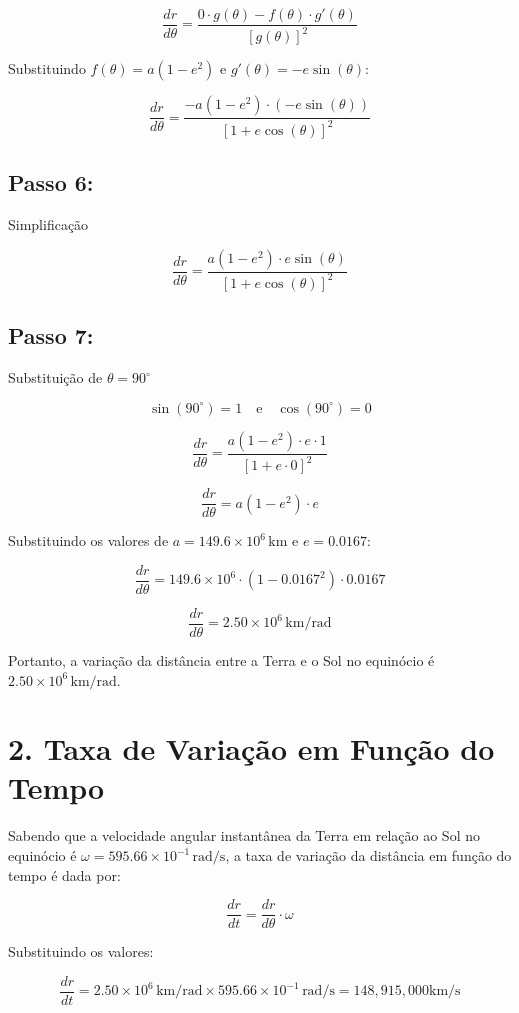 \documentclass[portuguese,12pt,a4paper,onecolumn]{article}
\begin{document}
	\[
	\frac{dr}{d\theta} = \frac{0 \cdot g(\theta) - f(\theta) \cdot g'(\theta)}{[g(\theta)]^2}
	\]
	
	Substituindo \( f(\theta) = a(1 - e^2) \) e \( g'(\theta) = -e \sin(\theta) \):
	
	\[
	\frac{dr}{d\theta} = \frac{-a(1 - e^2) \cdot (-e \sin(\theta))}{[1 + e \cos(\theta)]^2}
	\]
	
	\subsection{Passo 6:} Simplificação
	
	\[
	\frac{dr}{d\theta} = \frac{a(1 - e^2) \cdot e \sin(\theta)}{[1 + e \cos(\theta)]^2}
	\]
	
	
	\subsection{Passo 7:} Substituição de \( \theta = 90^\circ \)
	
	\[
	\sin(90^\circ) = 1 \quad \text{e} \quad \cos(90^\circ) = 0
	\]
	
	
	\[
	\frac{dr}{d\theta} = \frac{a(1 - e^2) \cdot e \cdot 1}{[1 + e \cdot 0]^2}
	\]
	
	
	\[
	\frac{dr}{d\theta} = a(1 - e^2) \cdot e
	\]
	
	Substituindo os valores de \( a = 149.6 \times 10^6 \, \text{km} \) e \( e = 0.0167 \):
	
	\[
	\frac{dr}{d\theta} = 149.6 \times 10^6 \cdot (1 - 0.0167^2) \cdot 0.0167
	\]
	
	\[
	\frac{dr}{d\theta} = 2.50 \times 10^6 \, \text{km/rad}
	\]
	
	Portanto, a variação da distância entre a Terra e o Sol no equinócio é \( 2.50 \times 10^6 \, \text{km/rad} \).
	
	\section*{2. Taxa de Variação em Função do Tempo}
	
	Sabendo que a velocidade angular instantânea da Terra em relação ao Sol no equinócio é \( \omega = 595.66 \times 10^{-1} \, \text{rad/s} \), a taxa de variação da distância em função do tempo é dada por:
	
	\[
	\frac{dr}{dt} = \frac{dr}{d\theta} \cdot \omega
	\]
	
	Substituindo os valores:
	
	\[
	\frac{dr}{dt} = 2.50 \times 10^{6} \, \text{km/rad} \times 595.66 \times 10^{-1} \, \text{rad/s} = 148,915,000 \text{km/s}
	\]
	
\end{document}
